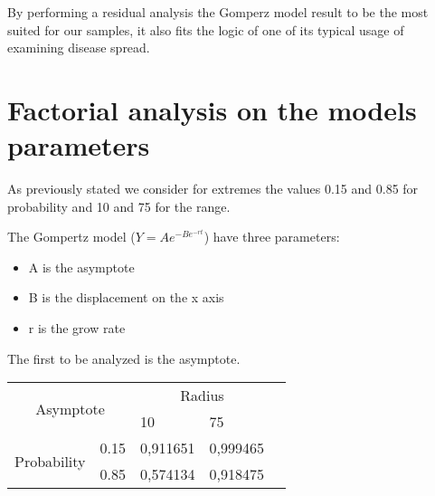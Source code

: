 By performing a residual analysis the Gomperz model result to be the most suited for our samples, it also fits the logic of one of its typical usage of examining disease spread.

\section{Factorial analysis on the models parameters}
As previously stated we consider for extremes the values 0.15 and 0.85 for probability and 10 and 75 for the range.

The Gompertz model ($ Y = Ae^{-Be^{-rt}} $) have three parameters:
\begin{itemize}
	\item A is the asymptote
	\item B is the displacement on the x axis
	\item r is the grow rate
\end{itemize}
The first to be analyzed is the asymptote.


\begin{table}[H]
\centering
\begin{tabular}{|cl|ll|l}
\cline{1-4}
\multicolumn{2}{|c|}{\multirow{2}{*}{Asymptote}}        & \multicolumn{2}{c|}{Radius}              &  \\ \cline{3-4}
\multicolumn{2}{|c|}{}                                  & \multicolumn{1}{l|}{10}       & 75       &  \\ \cline{1-4}
\multicolumn{1}{|c|}{\multirow{2}{*}{Probability}} & 0.15 & \multicolumn{1}{l|}{0,911651} & 0,999465 &  \\ \cline{2-4}
\multicolumn{1}{|c|}{}                             & 0.85 & \multicolumn{1}{l|}{0,574134} & 0,918475 &  \\ \cline{1-4}
\end{tabular}
\end{table}


